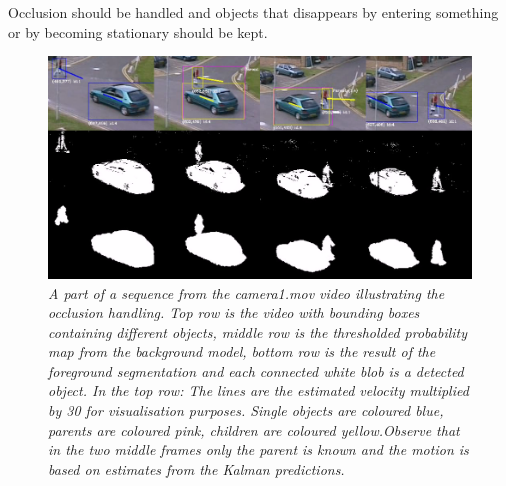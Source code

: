 Occlusion should be handled and objects that disappears by entering something or by becoming stationary should be kept.

\begin{figure}[h]
	\centering
	\includegraphics[width=\linewidth]{images/occlusionIllustration1.png}
	\caption{\textit{A part of a sequence from the camera1.mov video illustrating the occlusion handling. Top row is the video with bounding boxes containing different objects, middle row is the thresholded probability map from the background model, bottom row is the result of the foreground segmentation and each connected white blob is a detected object. In the top row: The lines are the estimated velocity multiplied by 30 for visualisation purposes. Single objects are coloured blue, parents are coloured pink, children are coloured yellow.Observe that in the two middle frames only the parent is known and the motion is based on estimates from the Kalman predictions. }}
	\label{fig:UML_fig} %
\end{figure}

